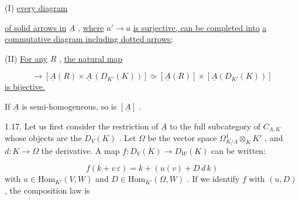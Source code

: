 (I)  \underline{every diagram}

\begin{center}
\end{center}
\underline{of solid arrows in} $\underline{A}$ , \underline{where} $a' \longrightarrow a$ \underline{is surjective, can be completed into} \underline{a commutative diagram including dotted arrows;}

(II)  \underline{For any} $R$ , \underline{the natural map}

\begin{equation*}
[\underline{A}(R \times_K D_{K'}(K))] \to [\underline{A}(R) \times \underline{A}\,(D_{K'}(K))] \simeq [\underline{A}(R)] \times [\underline{A}(D_{K'}(K))]
\end{equation*}
\underline{is bijective.}

If $\underline{A}$ is semi-homogeneous, so is $[\underline{A}]$ .

1.17.  Let us first consider the restriction of $\underline{A}$ to the full subcategory of $C_{\Lambda,K}$ whose objects are the $D_V(K)$ . Let $\Omega$ be the vector space $\Omega^1_{K/\Lambda} \otimes_K K'$ , and $d : K \to \Omega$ the derivative. A map $f : D_V(K) \to D_W(K)$ can be written:

\begin{equation*}
f(k + v\,\varepsilon) = k + (u(v) + D\,d\,k)
\end{equation*}
with $u \in \mathrm{Hom}_{K'}(V, W)$ and $D \in \mathrm{Hom}_{K'}(\Omega, W)$ . If we identify $f$ with $(u, D)$ , the composition law is

